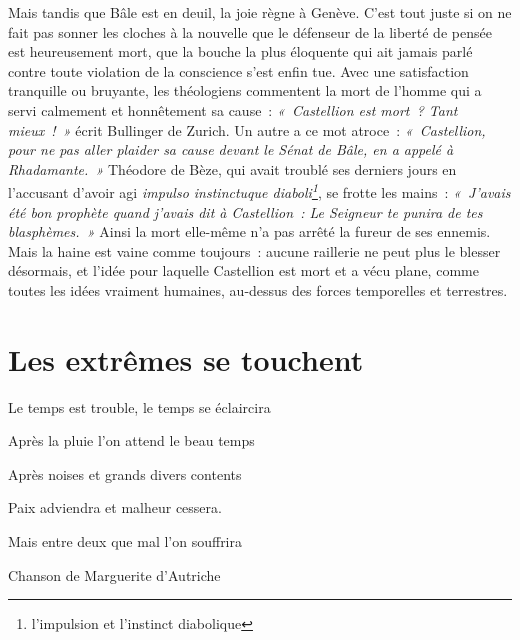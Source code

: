 \documentclass[french,twoside]{book} %
\newcommand\foreign[1]{\emph{#1}}
\newcommand{\bibl}[1]{{\smallskip\setlength{\RaggedLeftLeftskip}{2em plus \leftskip}\RaggedLeft\normalsize\normalfont #1\par\medskip}}}
\newcommand{\spl}[1]{\noindent\hangindent=2\parindent  #1\par} %
\newenvironment{epigraph}{\leftskip1.5\parindent \sffamily\large}{\bigskip}
\newcommand\chapteropen{} %
\newcommand\chapterclose{} %
\begin{document}
\noindent Mais tandis que Bâle est en deuil, la joie règne à Genève. C’est tout juste si on ne fait pas sonner les cloches à la nouvelle que le défenseur de la liberté de pensée est heureusement mort, que la bouche la plus éloquente qui ait jamais parlé contre toute violation de la conscience s’est enfin tue. Avec une satisfaction tranquille ou bruyante, les théologiens commentent la mort de l’homme qui a servi calmement et honnêtement sa cause : \emph{« Castellion est mort ? Tant mieux ! »} écrit Bullinger de Zurich. Un autre a ce mot atroce : \emph{« Castellion, pour ne pas aller plaider sa cause devant le Sénat de Bâle, en a appelé à Rhadamante. »} Théodore de Bèze, qui avait troublé ses derniers jours en l’accusant d’avoir agi \foreign{impulso instinctuque diaboli\footnote{l’impulsion et l’instinct diabolique}}, se frotte les mains : \emph{« J’avais été bon prophète quand j’avais dit à Castellion : Le Seigneur te punira de tes blasphèmes. »} Ainsi la mort elle-même n’a pas arrêté la fureur de ses ennemis. Mais la haine est vaine comme toujours : aucune raillerie ne peut plus le blesser désormais, et l’idée pour laquelle Castellion est mort et a vécu plane, comme toutes les idées vraiment humaines, au-dessus des forces temporelles et terrestres.
\chapterclose


\chapteropen

\chapter[{Les extrêmes se touchent}]{Les extrêmes se touchent}
\renewcommand{\leftmark}{Les extrêmes se touchent}


\begin{epigraph}
\spl{Le temps est trouble, le temps se éclaircira}
\spl{Après la pluie l’on attend le beau temps}
\spl{Après noises et grands divers contents}
\spl{}
\spl{Paix adviendra et malheur cessera.}
\spl{Mais entre deux que mal l’on souffrira}

\bibl{Chanson de Marguerite d’Autriche}
\end{epigraph}
\end{document}
